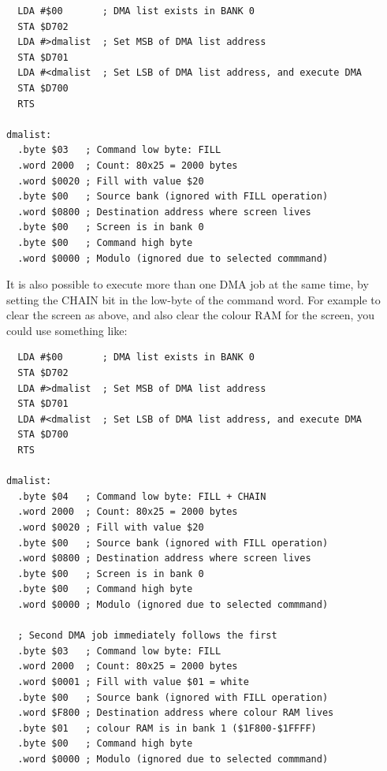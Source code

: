 \begin{tcolorbox}[colback=black,coltext=white]
\verbatimfont{\codefont}
\begin{verbatim}
  LDA #$00       ; DMA list exists in BANK 0
  STA $D702
  LDA #>dmalist  ; Set MSB of DMA list address
  STA $D701
  LDA #<dmalist  ; Set LSB of DMA list address, and execute DMA
  STA $D700
  RTS

dmalist:
  .byte $03   ; Command low byte: FILL
  .word 2000  ; Count: 80x25 = 2000 bytes
  .word $0020 ; Fill with value $20
  .byte $00   ; Source bank (ignored with FILL operation)
  .word $0800 ; Destination address where screen lives
  .byte $00   ; Screen is in bank 0
  .byte $00   ; Command high byte
  .word $0000 ; Modulo (ignored due to selected commmand)
\end{verbatim}
\end{tcolorbox}

It is also possible to execute more than one DMA job at the same time, by setting the CHAIN
bit in the low-byte of the command word. For example to clear the screen as above, and
also clear the colour RAM for the screen, you could use something like:

\begin{tcolorbox}[colback=black,coltext=white]
\verbatimfont{\codefont}
\begin{verbatim}
  LDA #$00       ; DMA list exists in BANK 0
  STA $D702
  LDA #>dmalist  ; Set MSB of DMA list address
  STA $D701
  LDA #<dmalist  ; Set LSB of DMA list address, and execute DMA
  STA $D700
  RTS

dmalist:
  .byte $04   ; Command low byte: FILL + CHAIN
  .word 2000  ; Count: 80x25 = 2000 bytes
  .word $0020 ; Fill with value $20
  .byte $00   ; Source bank (ignored with FILL operation)
  .word $0800 ; Destination address where screen lives
  .byte $00   ; Screen is in bank 0
  .byte $00   ; Command high byte
  .word $0000 ; Modulo (ignored due to selected commmand)

  ; Second DMA job immediately follows the first
  .byte $03   ; Command low byte: FILL
  .word 2000  ; Count: 80x25 = 2000 bytes
  .word $0001 ; Fill with value $01 = white
  .byte $00   ; Source bank (ignored with FILL operation)
  .word $F800 ; Destination address where colour RAM lives
  .byte $01   ; colour RAM is in bank 1 ($1F800-$1FFFF)
  .byte $00   ; Command high byte
  .word $0000 ; Modulo (ignored due to selected commmand)
\end{verbatim}
\end{tcolorbox}


